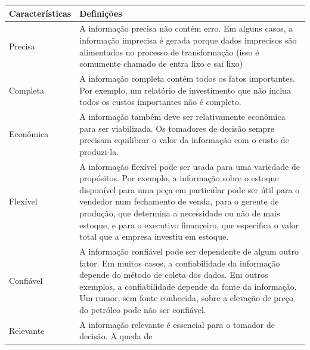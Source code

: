 \documentclass[a4paper]{article}
\begin{document}
\begin{flushleft}
\tablefirsthead{}
\tablehead{}
\tabletail{}
\tablelasttail{}
\begin{supertabular}{|m{3.1599998cm}|m{12.458cm}|}
\hline
{\sffamily\bfseries Caracter\'isticas} &
{\sffamily\bfseries Defini\c{c}\~oes}\\\hline
{\sffamily Precisa} &
{\sffamily A informa\c{c}\~ao precisa n\~ao cont\'em erro. Em alguns casos, a informa\c{c}\~ao
imprecisa \'e gerada porque dados imprecisos s\~ao alimentados no processo de transforma\c{c}\~ao (isso \'e comumente
chamado de entra lixo e sai lixo)}\\\hline
{\sffamily Completa} &
{\sffamily A informa\c{c}\~ao completa cont\'em todos os fatos importantes. Por exemplo, um
relat\'orio de investimento que n\~ao inclua todos os custos importantes n\~ao \'e completo.}\\\hline
{\sffamily Econ\^omica} &
{\sffamily A informa\c{c}\~ao tamb\'em deve ser relativamente econ\^omica para ser viabilizada.
Os tomadores de decis\~ao sempre precisam equilibrar o valor da informa\c{c}\~ao com o custo de produzi-la.}\\\hline
{\sffamily Flex\'ivel} &
{\sffamily A informa\c{c}\~ao flex\'ivel pode ser usada para uma variedade de prop\'ositos. Por
exemplo, a informa\c{c}\~ao sobre o estoque dispon\'ivel para uma pe\c{c}a em particular pode ser \'util para o
vendedor num fechamento de venda, para o gerente de produ\c{c}\~ao, que determina a necessidade ou n\~ao de mais
estoque, e para o executivo financeiro, que especifica o valor total que a empresa investiu em estoque.}\\\hline
{\sffamily Confi\'avel} &
{\sffamily A informa\c{c}\~ao confi\'avel pode ser dependente de algum outro fator. Em muitos
casos, a confiabilidade da informa\c{c}\~ao depende do m\'etodo de coleta dos dados. Em outros exemplos, a
confiabilidade depende da fonte da informa\c{c}\~ao. Um rumor, sem fonte conhecida, sobre a eleva\c{c}\~ao de pre\c{c}o
do petr\'oleo pode n\~ao ser confi\'avel.}\\\hline
{\sffamily Relevante} &
{\sffamily A informa\c{c}\~ao relevante \'e essencial para o tomador de decis\~ao. A queda de
}
\end{supertabular}
\end{flushleft}
\end{document}
